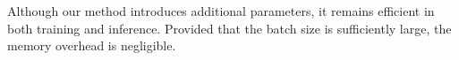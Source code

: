 Although our method introduces additional parameters, it remains efficient in both training and inference. Provided that the batch size is sufficiently large, the memory overhead is negligible.
